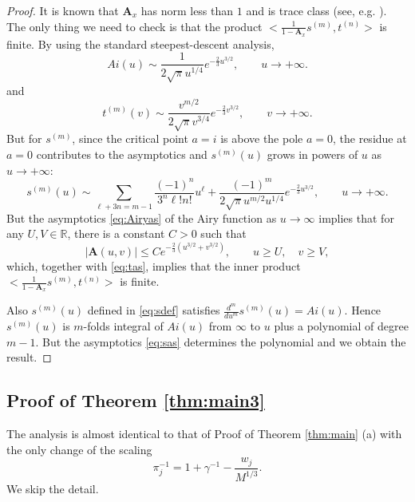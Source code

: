 \documentclass[11pt]{article}
\begin{document}
\begin{proof}
It is known that $\mathbf{A}_x$ has norm less than $1$ and is
trace class (see, e.g. \cite{TracyWidom}). The only thing we need
to check is that the product $< \frac{1}{1-\mathbf{A}_x}
  s^{(m)}, t^{(n)} >$ is finite. By using the standard
steepest-descent analysis,
\begin{equation}\label{eq:Airyas}
  Ai(u) \sim \frac{1}{2\sqrt\pi u^{1/4}} e^{-\frac23
  u^{3/2}},  \qquad u\to +\infty.
\end{equation}
and
\begin{equation}\label{eq:tas}
  t^{(m)}(v) \sim \frac{v^{m/2}}{2\sqrt\pi v^{3/4}} e^{-\frac23
  v^{3/2}},  \qquad v\to +\infty.
\end{equation}
But for $s^{(m)}$, since the critical point $a=i$ is above the
pole $a=0$, the residue at $a=0$ contributes to the asymptotics
and $s^{(m)}(u)$ grows in powers of $u$ as $u\to+\infty$:
\begin{equation}\label{eq:sas}
  s^{(m)}(u)\sim  \sum_{\ell+3n = m-1} \frac{(-1)^n}{3^n \ell ! n!}
  u^\ell + \frac{(-1)^m}{2\sqrt\pi u^{m/2} u^{1/4}} e^{-\frac23
  u^{3/2}} , \qquad u\to +\infty.
\end{equation}
But the asymptotics \eqref{eq:Airyas} of the Airy function as
$u\to\infty$ implies that for any $U, V\in \mathbb{R}$, there is a
constant $C>0$ such that
\begin{equation}
  |\mathbf{A}(u,v) | \le C e^{-\frac23(u^{3/2}+v^{3/2})}, \qquad u\ge U,
  \quad v\ge V,
\end{equation}
which, together with \eqref{eq:tas}, implies that the inner
product $< \frac{1}{1-\mathbf{A}_x} s^{(m)}, t^{(n)} >$ is finite.

Also $s^{(m)}(u)$ defined in \eqref{eq:sdef} satisfies
$\frac{d^m}{du^m} s^{(m)}(u) = Ai(u)$. Hence $s^{(m)}(u)$ is
$m$-folds integral of $Ai(u)$ from $\infty$ to $u$ plus a
polynomial of degree $m-1$. But the asymptotics \eqref{eq:sas}
determines the polynomial and we obtain the result.
\end{proof}

\subsection{Proof of Theorem \ref{thm:main3}}
\label{sec:main3}

The analysis is almost identical to that of Proof of Theorem
\ref{thm:main} (a) with the only change of the scaling
\begin{equation}
  \pi_j^{-1}= 1+\gamma^{-1}-\frac{w_j}{M^{1/3}}.
\end{equation}
We skip the detail.
\end{document}
